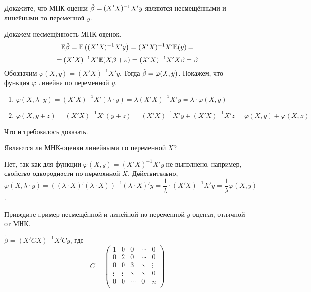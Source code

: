 \begin{problem}
Докажите, что МНК-оценки $\hat{\beta} = (X' X)^{-1} X' y$ являются несмещёнными и линейными по переменной $y$.


\begin{sol}
Докажем несмещённость МНК-оценок.
\[\mathbb{E}\hat{\beta} = \mathbb{E}\left( (X' X)^{-1} X' y \right) = (X' X)^{-1} X' \mathbb{E}(y) = \]
\[= (X' X)^{-1} X' \mathbb{E}(X\beta + \varepsilon) = (X' X)^{-1} X' X\beta = \beta\]
Обозначим $\varphi(X, y) = (X' X)^{-1} X' y$. Тогда $\hat{\beta} = \varphi(X, y)$. Покажем, что функция $\varphi$ линейна по переменной $y$.
\begin{enumerate}
\item $\varphi(X, \lambda \cdot y) = (X' X)^{-1} X' (\lambda \cdot y) = \lambda (X' X)^{-1} X' y = \lambda \cdot \varphi(X, y)$
\item $\varphi(X, y + z) = (X' X)^{-1} X' (y + z) = (X' X)^{-1} X' y + (X' X)^{-1} X' z = \varphi(X, y) + \varphi(X, z)$
\end{enumerate}
Что и требовалось доказать.
\end{sol}
\end{problem}


\begin{problem}
Являются ли МНК-оценки линейными по переменной $X$?


\begin{sol}
Нет, так как для функции $\varphi(X, y) = (X' X)^{-1} X' y$ не выполнено, например, свойство однородности по переменной $X$. Действительно,
\[\varphi(X, \lambda \cdot y) = ((\lambda \cdot X)' (\lambda \cdot X))^{-1} (\lambda \cdot X)' y = \frac{1}{\lambda} \cdot (X' X)^{-1} X' y = \frac{1}{\lambda} \varphi(X, y)\].
\end{sol}
\end{problem}


\begin{problem}
Приведите пример несмещённой и линейной по переменной $y$ оценки, отличной от МНК.


\begin{sol}
$\tilde{\beta} = (X' CX)^{-1} X' Cy$, где
\[C = \begin{pmatrix}
1 & 0 & 0 & \cdots & 0 \\
0 & 2 & 0 & \cdots & 0 \\
0 & 0 & 3 & \ddots & \vdots \\
\vdots & \vdots & \ddots & \ddots & 0 \\
0 & 0 & \cdots & 0 & n \\
\end{pmatrix} \]
\end{sol}
\end{problem}



